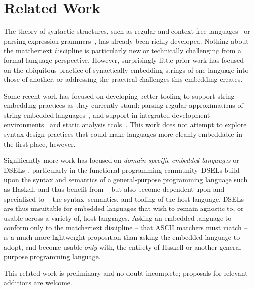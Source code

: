 \section{Related Work}
\label{sec:rel}

The theory of syntactic structures,
such as regular and
context-free languages~\cite{chomsky59algebraic}
or parsing expression grammars~\cite{ford04popl},
has already been richly developed.
Nothing about the matchertext discipline
is particularly new or technically challenging
from a formal language perspective.
However, surprisingly little prior work has focused on
the ubiquitous practice of synactically embedding
strings of one language into those of another,
or addressing the practical challenges this embedding creates.

Some recent work has focused on developing better tooling
to support string-embedding practices as they currently stand:
\eg parsing regular approximations
of string-embedded languages~\cite{verbitskaia15relaxed},
and support in
integrated development environments~\cite{grigorev14string}
and static analysis tools~\cite{khabibullin15development}.
This work does not attempt to explore syntax design practices
that could make languages more cleanly embeddable in the first place, however.

Significantly more work has focused on
\emph{domain specific embedded langauges}
or DSELs~\cite{hudak98modular},
particularly in the functional programming community.
DSELs build upon the syntax and semantics
of a general-purpose programming language such as Haskell,
and thus benefit from --
but also become dependent upon and specialized to --
the syntax, semantics, and tooling of the host language.
DSELs are thus unsuitable for embedded languages
that wish to remain agnostic to, or usable across a variety of,
host languages.
Asking an embedded language to conform only to the matchertext discipline --
that ASCII matchers must match --
is a much more lightweight proposition than
asking the embedded language to adopt, and become usable \emph{only} with,
the entirety of Haskell or another general-purpose programming language.


This related work is preliminary and no doubt incomplete;
proposals for relevant additions are welcome.

